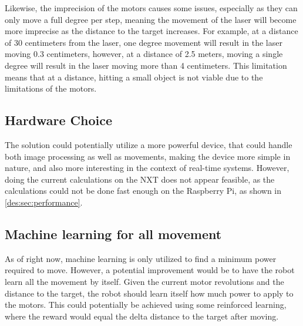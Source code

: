 Likewise, the imprecision of the motors causes some issues, especially as they can only move a full degree per step, meaning the movement of the laser will become more imprecise as the distance to the target increases.
For example, at a distance of 30 centimeters from the laser, one degree movement will result in the laser moving 0.3 centimeters, however, at a distance of 2.5 meters, moving a single degree will result in the laser moving more than 4 centimeters.
This limitation means that at a distance, hitting a small object is not viable due to the limitations of the motors.

\subsection{Hardware Choice}
The solution could potentially utilize a more powerful device, that could handle both image processing as well as movements, making the device more simple in nature, and also more interesting in the context of real-time systems.
However, doing the current calculations on the NXT does not appear feasible, as the calculations could not be done fast enough on the Raspberry Pi, as shown in \autoref{des:sec:performance}.
 
\subsection{Machine learning for all movement}
As of right now, machine learning is only utilized to find a minimum power required to move.
However, a potential improvement would be to have the robot learn all the movement by itself.
Given the current motor revolutions and the distance to the target, the robot should learn itself how much power to apply to the motors.
This could potentially be achieved using some reinforced learning, where the reward would equal the delta distance to the target after moving.
